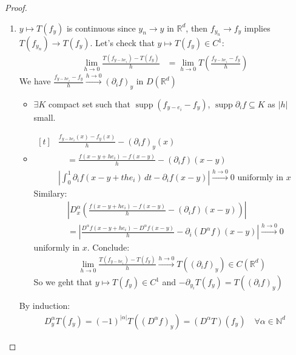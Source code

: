 \documentclass{report}
\theoremstyle{tommy}
\newcommand{\supp}{\operatorname{supp}}
\begin{document}
  \begin{proof}
    \begin{enumerate}[label=\alph*)]
      \item \(y \mapsto T(f_y)\) is continuous since \(y_n \to y\) in \(\mathbb{R}^d\), then 
      \(f_{y_n} \to f_y\) implies \(T(f_{y_n}) \to T(f_y)\). Let's check that \(y \mapsto T(f_y) \in C^1\):
      \begin{align*}
        \lim_{h \to 0} \frac{T(f_{y-he_i})-T(f_y)}{h}
        &= \lim_{h \to 0} T \left(\frac{f_{y-he_i} - f_y}{h}\right)
      \end{align*}
        We have \(\frac{f_{y - h e_i} - f_y}{h} \xrightarrow{h \to 0} (\partial_i f)_y\) in \(D(\mathbb{R}^d)\)
      \begin{itemize}
        \item \(\exists K\) compact set such that \(\supp(f_{y - e_i} - f_y)\), \(\supp \partial_i f \subseteq K\) as \(|h|\) small.
        \item \(\begin{aligned}[t]
          &\frac{f_{y - h e_i}(x)- f_y(x)}{h} - (\partial_i f)_y(x) \\
          &\quad = \frac{f(x-y+he_i) - f(x-y)}{h} - (\partial_i f)(x-y) \\
          &\left| \int_0^1 \partial_i f(x-y+the_i) \, dt - \partial_i f(x-y) \right| \xrightarrow{h \to 0} 0 \text{ uniformly in } x
        \end{aligned}\) \\
        Similary:
        \begin{align*}
          &\left| D_x^\alpha \left(\frac{f(x-y+he_i) - f(x-y)}{h} - (\partial_i f)(x-y)\right) \right| \\
          &= \left| \frac{D^\alpha f(x-y+he_i) - D^\alpha f(x-y)}{h} - \partial_i(D^\alpha f)(x-y) \right| \xrightarrow{h \to 0} 0 
        \end{align*}
        uniformly in \(x\). Conclude: 
        \begin{align*}
          \lim_{h \to 0} \frac{T(f_{y - he_i}) - T(f_y)}{h} \xrightarrow{h \to 0} T((\partial_i f)_y) \in C(\mathbb{R}^d)
        \end{align*}
        So we geht that \(y \mapsto T(f_y) \in C^1\) and \(- \partial_{y_i} T(f_y) = T((\partial_i f)_y)\)
      \end{itemize}
      By induction: 
      \begin{align*}
        D_y^\alpha T(f_y) = (-1)^{|\alpha|} T((D^\alpha f)_y) = (D^\alpha T)(f_y) \quad \forall \alpha \in \mathbb{N}^d

\end{align*}
\end{enumerate}
\end{proof}
\end{document}
